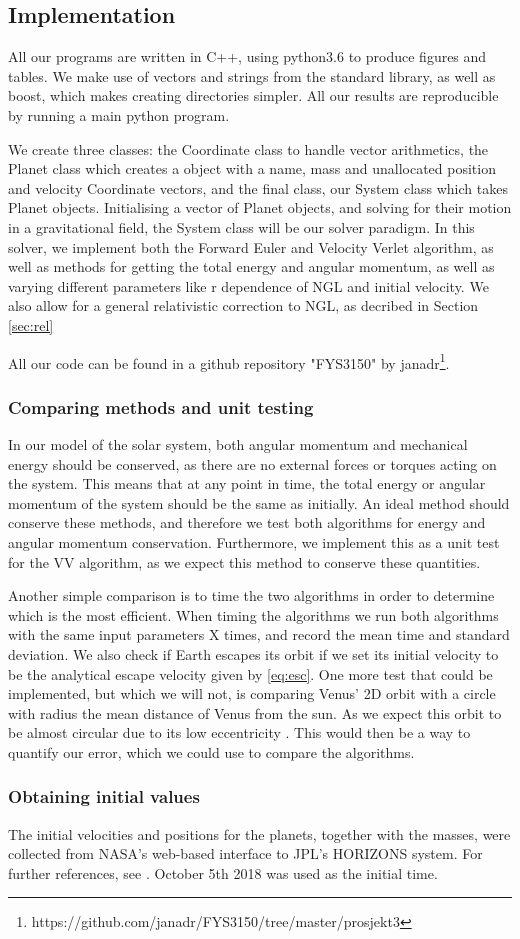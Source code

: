 \subsection{Implementation}
All our programs are written in C++, using python3.6 to produce figures and tables.
We make use of vectors and strings from the standard library, as well as boost,
which makes creating directories simpler. All our results are reproducible
by running a main python program.

We create three classes: the Coordinate class to handle vector arithmetics, the Planet
class which creates a object with a name, mass and unallocated position and velocity Coordinate vectors,
and the final class, our System class which takes Planet objects. Initialising
a vector of Planet objects, and solving for their motion in a gravitational field, the System
class will be our solver paradigm. In this solver, we implement both the Forward Euler and
Velocity Verlet algorithm, as well as methods for getting the total energy and angular
momentum, as well as varying different parameters like r dependence of NGL and initial velocity.
We also allow for a general relativistic correction to NGL, as decribed in Section \ref{sec:rel}

All our code can be found in
a github repository "FYS3150" by janadr\footnote{https://github.com/janadr/FYS3150/tree/master/prosjekt3}.
\subsubsection{Comparing methods and unit testing} \label{sec:tests}
In our model of the solar system, both angular momentum and mechanical energy should be conserved, as there
are no external forces or torques acting on the system. This means that at any point in time, the total energy or
angular momentum of the system should be the same as initially. An ideal method should conserve these methods,
and therefore we test both algorithms for energy and angular momentum conservation.
Furthermore, we implement this as a unit test for the VV algorithm, as we expect this method to conserve these quantities.

Another simple comparison is to time the two algorithms in order to determine which is the most efficient. When timing the algorithms we run both algorithms with the same input parameters X times, and record the mean time and standard deviation.
We also check if Earth escapes its orbit if we set its initial velocity to be the analytical
escape velocity given by \ref{eq:esc}.
One more test that could be implemented, but which we will not, is comparing Venus' 2D orbit with a circle
with radius the mean distance of Venus from the sun. As we expect this orbit to be
almost circular due to its low eccentricity \cite{planetaryfactsheet}. This would then
be a way to quantify our error, which we could use to compare the algorithms.

\subsubsection{Obtaining initial values}
The initial velocities and positions for the planets, together with the masses, were collected from NASA's web-based interface to JPL's HORIZONS system. For further references, see \cite{horizon}. October 5th 2018 was used as the initial time.
